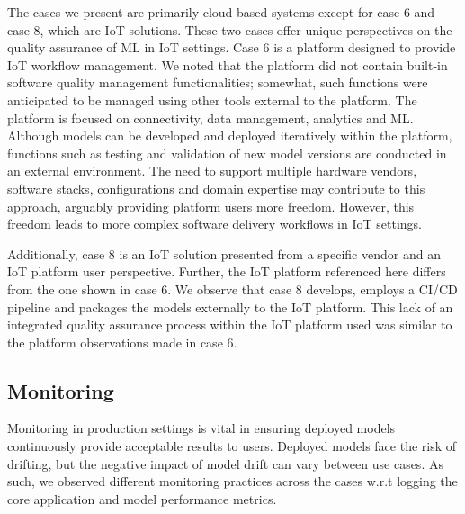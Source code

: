 The cases we present are primarily cloud-based systems except for case 6 and case 8, which are IoT solutions. These two cases offer unique perspectives on the quality assurance of ML in IoT settings. Case 6 is a platform designed to provide IoT workflow management. We noted that the platform did not contain built-in software quality management functionalities; somewhat, such functions were anticipated to be managed using other tools external to the platform. The platform is focused on connectivity, data management, analytics and ML. Although models can be developed and deployed iteratively within the platform, functions such as testing and validation of new model versions are conducted in an external environment. The need to support multiple hardware vendors, software stacks, configurations and domain expertise may contribute to this approach, arguably providing platform users more freedom. However, this freedom leads to more complex software delivery workflows in IoT settings.

Additionally, case 8 is an IoT solution presented from a specific vendor and an IoT platform user perspective. Further, the IoT platform referenced here differs from the one shown in case 6. We observe that case 8 develops, employs a CI/CD pipeline and packages the models externally to the IoT platform. This lack of an integrated quality assurance process within the IoT platform used was similar to the platform observations made in case 6.

\subsection{Monitoring}
Monitoring in production settings is vital in ensuring deployed models continuously provide acceptable results to users. Deployed models face the risk of drifting, but the negative impact of model drift can vary between use cases. As such, we observed different monitoring practices across the cases w.r.t logging the core application and model performance metrics.

